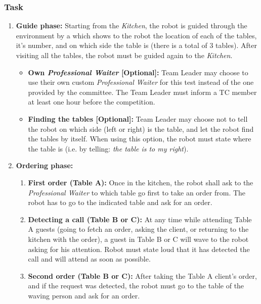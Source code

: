 \subsubsection{Task}
\begin{enumerate}

\item \textbf{Guide phase:} Starting from the \textit{Kitchen}, the robot is guided through the environment by a  which shows to the robot the location of each of the tables, it's number, and on which side the table is (there is a total of 3 tables). After visiting all the tables, the robot must be guided again to the \textit{Kitchen}.
\begin{itemize}
\item \textbf{Own \textit{Professional Waiter} [Optional]:} Team Leader may choose to use their own custom \textit{Professional Waiter} for this test instead of the one provided by the committee. The Team Leader must inform a TC member at least one hour before the competition.
\item \textbf{Finding the tables [Optional]:} Team Leader may choose not to tell the robot on which side (left or right) is the table, and let the robot find the tables by itself. When using this option, the robot must state where the table is (i.e. by telling: \textit{the table is to my right}).
\end{itemize}

\item \textbf{Ordering phase:}
\begin{enumerate}
\item \textbf{First order (Table A):} Once in the kitchen, the robot shall ask to the \textit{Professional Waiter} to which table go first to take an order from. The robot has to go to the indicated table and ask for an order.

\item \textbf{Detecting a call (Table B or C):} At any time while attending Table A guests (going to fetch an order, asking the client, or returning to the kitchen with the order), a guest in Table B or C will wave to the robot asking for his attention. Robot must state loud that it has detected the call and will attend as soon as possible.

\item \textbf{Second order (Table B or C):} After taking the Table A client's order, and if the request was detected, the robot must go to the table of the waving person and ask for an order.


\end{enumerate}
\end{enumerate}
